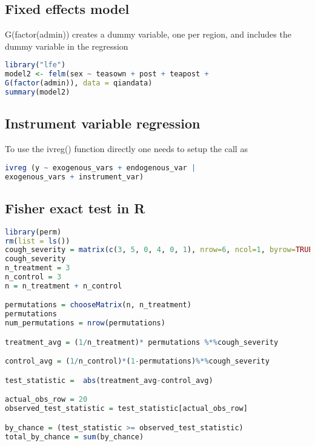 \subsection {Fixed effects model} \label {r: fem}
G(factor(admin)) creates a dummy variable, one per region, and includes the dummy variable
in the regression
\begin{lstlisting}[language=R]
library("lfe")
model2 <- felm(sex ~ teasown + post + teapost + 
G(factor(admin)), data = qiandata)
summary(model2)
\end{lstlisting}

\subsection {Instrument variable regression}
To use the ivreg() function directly one needs to setup the call as
\begin{lstlisting}[language=R]
ivreg (y ~ exogenous_vars + endogenous_var | 
exogenous_vars + instrument_var)
\end{lstlisting}

\subsection {Fisher exact test in R}
\begin{lstlisting}[language=R]
library(perm)
rm(list = ls())
cough_severity = matrix(c(3, 5, 0, 4, 0, 1), nrow=6, ncol=1, byrow=TRUE)
cough_severity
n_treatment = 3
n_control = 3
n = n_treatment + n_control

permutations = chooseMatrix(n, n_treatment)
permutations
num_permutations = nrow(permutations)

treatment_avg = (1/n_treatment)* permutations %*%cough_severity

control_avg = (1/n_control)*(1-permutations)%*%cough_severity

test_statistic =  abs(treatment_avg-control_avg)

actual_obs_row = 20
observed_test_statistic = test_statistic[actual_obs_row]

by_chance = (test_statistic >= observed_test_statistic)
total_by_chance = sum(by_chance)
\end{lstlisting}
